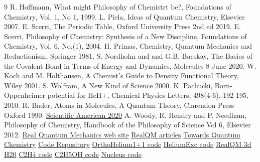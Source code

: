 \documentclass[11pt]{article} %
\begin{document}
\begin{thebibliography}{9}
 R.  Hoffmann,  What might Philosophy of Chemistrt be?,  Foundations of Chemistry,  Vol. 1,  No 1,  1999.
 L. Piela,  Ideas of Quantum Chemistry,  Elsevier 2007.
 E. Scerri, The Periodic Table,  Oxford University Press 2nd ed 2019.
 E. Scerri,  Philosophy of Chemistry: Synthesis of a New Discipline, Foundations of Chemistry,  Vol. 6,  No.(1), 2004.
 H. Primas,  Chemistry,  Quantum Mechanics and Reductionism,  Springer 1981. 
 S. Nordholm and and G.B. Bacskay,  The Basics of the Covalent Bond in Terms of Energy and Dynamics,  Molecules 8 June 2020.
 W.  Koch and M. Holthausen,  A Chemist's Guide to Density Functional Theory,  Wiley 2001.
 S. Wolfram,  A New Kind of Science 2000.
 K. Pachucki,  Born-Oppenheimer potential for HeH+,  Chemical  Physics Letters, 498(4-6), 192-195, 2010.
 R. Bader,  Atoms in Molecules, A Quantum Theory,  Clarendon Press Oxford 1990. 
 \href{https://www.scientificamerican.com/article/the-first-molecule-in-the-universe/}{Scientific American 2020}
 A. Woody,  R. Hendry and P.  Needham,  Philosophy of Chemistry,  Handbook of the Philosophy of Science Vol 6,  Elsevier 2012.
 \href{https://physicalquantummechanics.wordpress.com}{Real Quantum Mechanics web site} 
 \href{https://physicalquantummechanics.wordpress.com/articles}{RealQM articles} 
\href{https://claesjohnson.blogspot.com}{Towards Quantum Chemistry}
\href{https://physicalquantummechanics.wordpress.com/code-repository/         }{Code Repository} 
\href{https://editor.p5js.org/claesjohnson/full/UDL23Mw-2}{OrthoHelium1+1 code}
\href{https://editor.p5js.org/claesjohnson/full/__FwBGV5m}{HeliumExc code}
\href{https://editor.p5js.org/claesjohnson/full/sH9uSZvkQ}{RealQM 3d H20}
\href{https://editor.p5js.org/claesjohnson/full/KsLTZcGvC}{C2H4 code}
\href{https://editor.p5js.org/claesjohnson/full/NrtgM15eH}{C2H5OH code}
\href{https://editor.p5js.org/claesjohnson/full/hZmA2tDjw}{Nucleus code}

\end{thebibliography}
\end{document}
